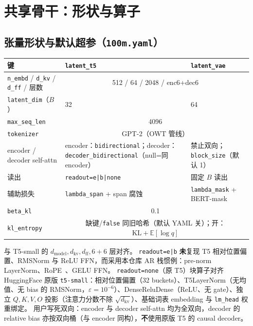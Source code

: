 \documentclass[UTF8,a4paper,11pt]{ctexart}
\begin{document}
\section{共享骨干：形状与算子}

\subsection{张量形状与默认超参（\texttt{100m.yaml}）}
\label{sec:shape}

\begin{center}
\begin{tabular}{lll}
\toprule
键 & \texttt{latent\_t5} & \texttt{latent\_vae} \\
\midrule
\texttt{n\_embd} / \texttt{d\_kv} / \texttt{d\_ff} / 层数 & \multicolumn{2}{c}{512 / 64 / 2048 / enc6+dec6} \\
\texttt{latent\_dim}（$B$） & 32 & 64 \\
\texttt{max\_seq\_len} & \multicolumn{2}{c}{4096} \\
\texttt{tokenizer} & \multicolumn{2}{c}{GPT-2（OWT 管线）} \\
encoder / decoder self-attn & encoder：\texttt{bidirectional}；decoder：\texttt{decoder\_bidirectional}（null=同 encoder） & 禁止双向；\texttt{block\_size}（默认 1） \\
读出 & \texttt{readout=e|b|none} & 固定 $B$ 读出 \\
辅助损失 & \texttt{lambda\_span} + span 腐蚀 & \texttt{lambda\_mask} + BERT-mask \\
\texttt{beta\_kl} & \multicolumn{2}{c}{0.1} \\
\texttt{kl\_entropy} & \multicolumn{2}{c}{缺键/\texttt{false} 同旧哈希（默认 YAML 关）；开：$\mathrm{KL}+\mathbb{E}[\log q]$} \\
\bottomrule
\end{tabular}
\end{center}

与 T5-small 的 $d_{\mathrm{model}}, d_{\mathrm{kv}}, d_{\mathrm{ff}}, 6{+}6$ 层对齐。
\texttt{readout=e|b} \textbf{未}复现 T5 相对位置偏置、RMSNorm 与 ReLU FFN，而采用本仓库 AR 栈惯例：pre-norm LayerNorm、RoPE~\cite{su2024rope}、GELU FFN。
\texttt{readout=none}（原 T5）块算子对齐 HuggingFace 原版 \texttt{t5-small}：相对位置偏置（32 buckets）、T5LayerNorm（无均值、无 bias 的 RMSNorm，$\varepsilon{=}10^{-6}$）、DenseReluDense（ReLU、无 gate）、独立 $Q,K,V,O$ 投影（注意力分数不除 $\sqrt{d_{\mathrm{kv}}}$）、基础词表 embedding 与 \texttt{lm\_head} 权重绑定。
用户写死双向：encoder 与 decoder self-attn 均为全双向，decoder 的 relative bias 亦按双向桶（与 encoder 同构），\textbf{不}使用原版 T5 的 causal decoder。
\end{document}
